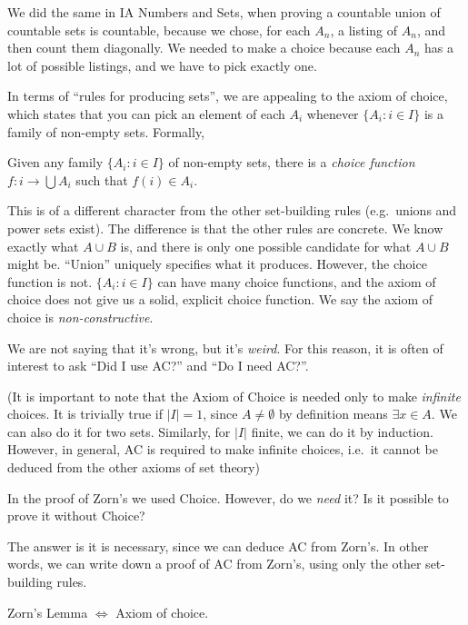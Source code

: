\documentclass[a4paper]{article}
\begin{document}
We did the same in IA Numbers and Sets, when proving a countable union of countable sets is countable, because we chose, for each $A_n$, a listing of $A_n$, and then count them diagonally. We needed to make a choice because each $A_n$ has a lot of possible listings, and we have to pick exactly one.

In terms of ``rules for producing sets'', we are appealing to the axiom of choice, which states that you can pick an element of each $A_i$ whenever $\{A_i: i\in I\}$ is a family of non-empty sets. Formally,
\begin{axiom}
  Given any family $\{A_i: i\in I\}$ of non-empty sets, there is a \emph{choice function} $f: i \to \bigcup A_i$ such that $f(i)\in A_i$.
\end{axiom}
This is of a different character from the other set-building rules (e.g.\ unions and power sets exist). The difference is that the other rules are concrete. We know exactly what $A\cup B$ is, and there is only one possible candidate for what $A\cup B$ might be. ``Union'' uniquely specifies what it produces. However, the choice function is not. $\{A_i:i\in I\}$ can have many choice functions, and the axiom of choice does not give us a solid, explicit choice function. We say the axiom of choice is \emph{non-constructive}.

We are not saying that it's wrong, but it's \emph{weird}. For this reason, it is often of interest to ask ``Did I use AC?'' and ``Do I need AC?''.

(It is important to note that the Axiom of Choice is needed only to make \emph{infinite} choices. It is trivially true if $|I| = 1$, since $A\not=\emptyset$ by definition means $\exists x\in A$. We can also do it for two sets. Similarly, for $|I|$ finite, we can do it by induction. However, in general, AC is required to make infinite choices, i.e.\ it cannot be deduced from the other axioms of set theory)

In the proof of Zorn's we used Choice. However, do we \emph{need} it? Is it possible to prove it without Choice?

The answer is it is necessary, since we can deduce AC from Zorn's. In other words, we can write down a proof of AC from Zorn's, using only the other set-building rules.

\begin{thm}
  Zorn's Lemma $\Leftrightarrow$ Axiom of choice.
\end{thm}
\end{document}

